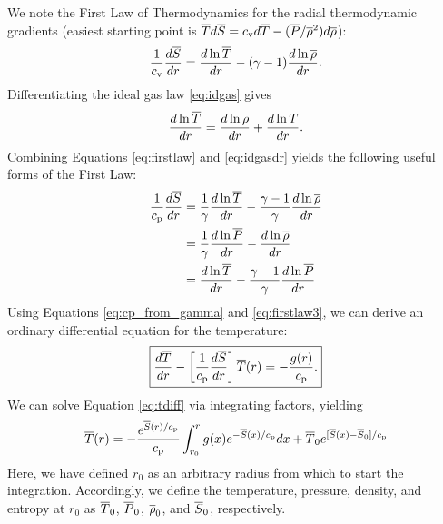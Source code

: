 \documentclass[12pt]{article}
\numberwithin{equation}{section}
\begin{document}
	We note the First Law of Thermodynamics for the radial thermodynamic gradients (easiest starting point is $\overline{T} d\overline{S}=c_{\rm{v}} d\overline{T}-(\overline{P}/\overline{\rho}^2)d\overline{\rho}$):
	\begin{align}
	\frac{1}{c_{\rm{v}}}\frac{d\overline{S}}{dr} =\frac{d\ln\overline{T}}{dr} - (\gamma - 1)\frac{d\ln\overline{\rho}}{dr}.
	\label{eq:firstlaw}
	\end{align}
	Differentiating the ideal gas law \eqref{eq:idgas} gives
	\begin{align}
	\frac{d\ln\overline{T}}{dr} = \frac{d\ln{\rho}}{dr} + \frac{d\ln{T}}{dr}. 
	\label{eq:idgasdr}
	\end{align}
	Combining Equations \eqref{eq:firstlaw} and \eqref{eq:idgasdr} yields the following useful forms of the First Law:
	\begin{subequations}
		\begin{align}
		\frac{1}{c_{\rm{p}}}\frac{d\overline{S}}{dr} &=\frac{1}{\gamma}\frac{d\ln\overline{T}}{dr} - \frac{\gamma - 1}{\gamma}\frac{d\ln\overline{\rho}}{dr}\label{eq:firstlawtmprho}\\
		&=\frac{1}{\gamma}\frac{d\ln\overline{P}}{dr} - \frac{d\ln\overline{\rho}}{dr}\label{eq:firstlawprsrho}\\
		&= \frac{d\ln\overline{T}}{dr} - \frac{\gamma - 1}{\gamma}\frac{d\ln\overline{P}}{dr}\label{eq:firstlawtmpprs}
		\end{align}
		\label{eq:firstlaw3}
	\end{subequations}
	Using Equations \eqref{eq:cp_from_gamma} and \eqref{eq:firstlaw3}, we can derive an ordinary differential equation for the temperature:
	\begin{align}
	\boxed{
	\frac{d\overline{T}}{dr} - \left[\frac{1}{c_{\rm{p}}}\frac{d\overline{S}}{dr}\right]\overline{T}(r) = -\frac{g(r)}{c_{\rm{p}}}.
}
\label{eq:tdiff}
	\end{align}
	We can solve Equation \eqref{eq:tdiff} via integrating factors, yielding 
	\begin{align}
	\overline{T}(r) = -\frac{e^{\overline{S}(r)/c_{\rm{p}}}}{c_{\rm{p}}}\int_{r_0}^r g(x)e^{-\overline{S}(x)/c_{\rm{p}}}dx + \overline{T}_0e^{[\overline{S}(x)-\overline{S}_0]/c_{\rm{p}}}
	\label{eq:tgeneral0}
	\end{align}
	Here, we have defined $r_0$ as an arbitrary radius from which to start the integration. Accordingly, we define the temperature, pressure, density, and entropy at $r_0$ as $\overline{T}_0$, $\overline{P}_0$, $\overline{\rho}_0$, and $\overline{S}_0$, respectively.
	
\end{document}
